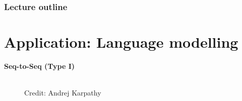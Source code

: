 
 







\begin{frame}
\frametitle{Lecture outline}
\tableofcontents
\end{frame}

\section{Application: Language modelling}

%
%  


\begin{frame}

\vspace{15mm}
\hspace{25mm} \textbf{\LARGE{Seq-to-Seq (Type I)}}
\begin{figure}
      \centering
      \tiny{\\Credit: Andrej Karpathy}
  \end{figure}
  
\end{frame}

